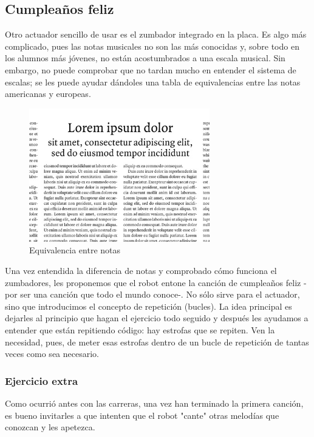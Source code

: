 \subsection{Cumpleaños feliz}
Otro actuador sencillo de usar es el zumbador integrado en la placa. Es algo más complicado, pues las notas musicales no son las más conocidas y, sobre todo en los alumnos más jóvenes, no están acostumbrados a una escala musical. Sin embargo, no puede comprobar que no tardan mucho en entender el sistema de escalas; se les puede ayudar dándoles una tabla de equivalencias entre las notas americanas y europeas. 
\begin{figure}[H]
	\centering
	\includegraphics[width=0.7\textwidth]{img/lorem.jpg}
	\caption{Equivalencia entre notas}	
\end{figure}
Una vez entendida la diferencia de notas y comprobado cómo funciona el zumbadores, les proponemos que el robot entone la canción de cumpleaños feliz -por ser una canción que todo el mundo conoce-. No sólo sirve para el actuador, sino que introducimos el concepto de repetición (bucles). La idea principal es dejarles al principio que hagan el ejercicio todo seguido y después les ayudamos a entender que están repitiendo código: hay estrofas que se repiten. Ven la necesidad, pues, de meter esas estrofas dentro de un bucle de repetición de tantas veces como sea necesario.\\
\subsubsection{Ejercicio extra}
Como ocurrió antes con las carreras, una vez han terminado la primera canción, es bueno invitarles a que intenten que el robot "cante" otras melodías que conozcan y les apetezca. 

